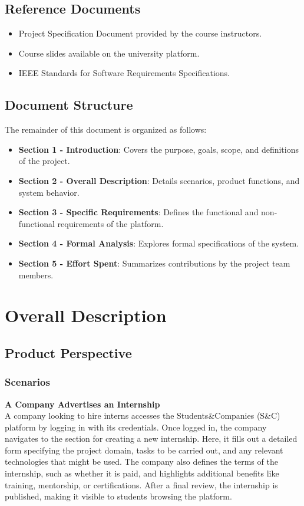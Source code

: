\documentclass[12pt]{article}
\begin{document}
\subsection{Reference Documents}
\begin{itemize}
    \item Project Specification Document provided by the course instructors.
    \item Course slides available on the university platform.
    \item IEEE Standards for Software Requirements Specifications.
\end{itemize}

\subsection{Document Structure}
The remainder of this document is organized as follows:
\begin{itemize}
    \item \textbf{Section 1 - Introduction}: Covers the purpose, goals, scope, and definitions of the project.
    \item \textbf{Section 2 - Overall Description}: Details scenarios, product functions, and system behavior.
    \item \textbf{Section 3 - Specific Requirements}: Defines the functional and non-functional requirements of the platform.
    \item \textbf{Section 4 - Formal Analysis}: Explores formal specifications of the system.
    \item \textbf{Section 5 - Effort Spent}: Summarizes contributions by the project team members.
\end{itemize}

\newpage

\section{Overall Description}

\subsection{Product Perspective}

\subsubsection{Scenarios}

\textbf{A Company Advertises an Internship} \\
A company looking to hire interns accesses the Students\&Companies (S\&C) platform by logging in with its credentials. Once logged in, the company navigates to the section for creating a new internship. Here, it fills out a detailed form specifying the project domain, tasks to be carried out, and any relevant technologies that might be used. The company also defines the terms of the internship, such as whether it is paid, and highlights additional benefits like training, mentorship, or certifications. After a final review, the internship is published, making it visible to students browsing the platform.
\end{document}
